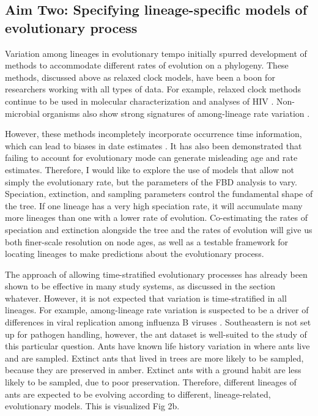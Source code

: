 \documentclass[]{article}
\begin{document}
\subsection*{Aim Two: Specifying lineage-specific models of evolutionary process}

Variation among lineages in evolutionary tempo initially spurred development of methods to accommodate different rates of evolution on a phylogeny.
These methods, discussed above as relaxed clock models, have been a boon for researchers working with all types of data.
For example, relaxed clock methods continue to be used in molecular characterization and analyses of HIV \cite{park2016}. 
Non-microbial organisms also show strong signatures of among-lineage rate variation \cite{bapst2016}. \par
However, these methods incompletely incorporate occurrence time information, which can lead to biases in date estimates \cite{heath2014, slater214}.
It has also been demonstrated that failing to account for evolutionary mode can generate misleading age and rate estimates. 
Therefore, I would like to explore the use of models that allow not simply the evolutionary rate, but the parameters of the FBD analysis to vary.
Speciation, extinction, and sampling parameters control the fundamental shape of the tree. 
If one lineage has a very high speciation rate, it will accumulate many more lineages than one with a lower rate of evolution.
Co-estimating the rates of speciation and extinction alongside the tree and the rates of evolution will give us both finer-scale resolution on node ages, as well as a testable framework for locating lineages to make predictions about the evolutionary process. \par
The approach of allowing time-stratified evolutionary processes has already been shown to be effective in many study systems, as discussed in the section whatever.
However, it is not expected that variation is time-stratified in all lineages.
For example, among-lineage rate variation is suspected to be a driver of differences in viral replication among influenza B viruses \cite{timofeeva2017}.
Southeastern is not set up for pathogen handling, however, the ant dataset is well-suited to the study of this particular question.
Ants have known life history variation in where ants live and are sampled.
Extinct ants that lived in trees are more likely to be sampled, because they are preserved in amber.
Extinct ants with a ground habit are less likely to be sampled, due to poor preservation. 
Therefore, different lineages of ants are expected to be evolving according to different, lineage-related, evolutionary models. 
This is visualized Fig 2b. \par
\end{document}
